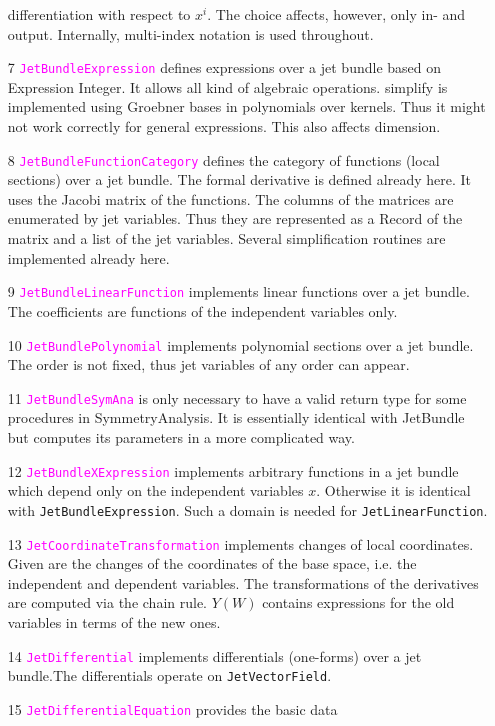 \documentclass[12pt,a4paper]{article}
\newcommand{\spadfun}[1]{\textcolor{magenta}{\tt #1}}
\begin{document}
\begin{itemize}
differentiation with respect to $x^i$. The choice affects, however, 
only in- and output. Internally, multi-index notation is used throughout.
%
\item[7] \spadfun{JetBundleExpression} defines expressions over a jet 
bundle based on Expression Integer. It allows all kind of algebraic 
operations. simplify is implemented using Groebner bases in polynomials 
over kernels. Thus it might not work correctly for general expressions. 
This also affects dimension.
%
\item[8] \spadfun{JetBundleFunctionCategory} defines the category of 
functions (local sections) over a jet bundle. The formal derivative is 
defined already here. It uses the Jacobi matrix of the functions. The 
columns of the matrices are enumerated by jet variables. Thus they are 
represented as a Record of the matrix and a list of the jet variables. 
Several simplification routines are implemented already here.
%
\item[9] \spadfun{JetBundleLinearFunction} implements linear functions 
over a jet bundle. The coefficients are functions of the independent 
variables only.
%
\item[10] \spadfun{JetBundlePolynomial} implements polynomial sections 
over a jet bundle. The order is not fixed, thus jet variables of any 
order can appear.
%
\item[11] \spadfun{JetBundleSymAna} is only necessary to have a valid 
return type for some procedures in SymmetryAnalysis. It is essentially 
identical with JetBundle but computes its parameters in a more 
complicated way.
%
\item[12] \spadfun{JetBundleXExpression} implements arbitrary functions in 
a jet bundle which depend only on the independent variables $x$. Otherwise 
it is identical with {\tt JetBundleExpression}. Such a domain is needed 
for {\tt JetLinearFunction}.
%
\item[13] \spadfun{JetCoordinateTransformation} implements changes of 
local coordinates. Given are the changes of the coordinates of the base 
space, i.e. the independent and dependent variables. The transformations 
of the derivatives are computed via the chain rule. $Y (W)$ contains 
expressions for the old variables in terms of the new ones.
%
\item[14] \spadfun{JetDifferential} implements differentials (one-forms) 
over a jet bundle.The differentials operate on {\tt JetVectorField}.
%
\item[15] \spadfun{JetDifferentialEquation} provides the basic data 

\end{itemize}
\end{document}
